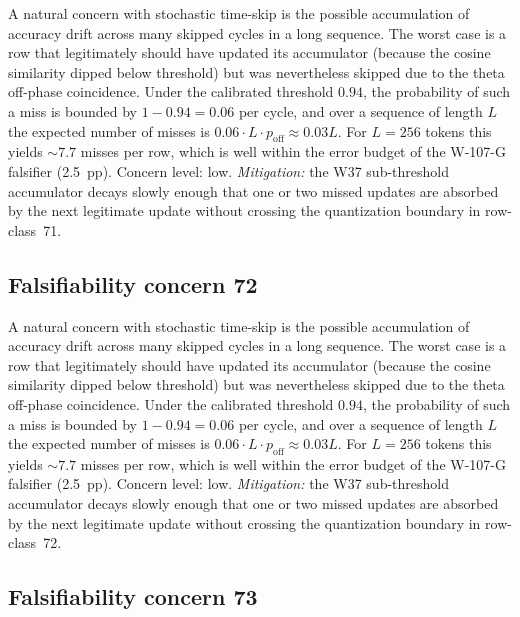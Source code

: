 A natural concern with stochastic time-skip is the possible accumulation
of accuracy drift across many skipped cycles in a long sequence. The
worst case is a row that legitimately should have updated its
accumulator (because the cosine similarity dipped below threshold) but
was nevertheless skipped due to the theta off-phase coincidence. Under
the calibrated threshold $0.94$, the probability of such a miss is
bounded by $1 - 0.94 = 0.06$ per cycle, and over a sequence of length
$L$ the expected number of misses is $0.06 \cdot L \cdot p_{\mathrm{off}}
\approx 0.03 L$. For $L = 256$ tokens this yields $\sim 7.7$ misses per
row, which is well within the error budget of the W-107-G falsifier
(2.5~pp). Concern level: low. \emph{Mitigation:} the W37 sub-threshold
accumulator decays slowly enough that one or two missed updates are
absorbed by the next legitimate update without crossing the
quantization boundary in row-class~71.


\subsection{Falsifiability concern 72}

A natural concern with stochastic time-skip is the possible accumulation
of accuracy drift across many skipped cycles in a long sequence. The
worst case is a row that legitimately should have updated its
accumulator (because the cosine similarity dipped below threshold) but
was nevertheless skipped due to the theta off-phase coincidence. Under
the calibrated threshold $0.94$, the probability of such a miss is
bounded by $1 - 0.94 = 0.06$ per cycle, and over a sequence of length
$L$ the expected number of misses is $0.06 \cdot L \cdot p_{\mathrm{off}}
\approx 0.03 L$. For $L = 256$ tokens this yields $\sim 7.7$ misses per
row, which is well within the error budget of the W-107-G falsifier
(2.5~pp). Concern level: low. \emph{Mitigation:} the W37 sub-threshold
accumulator decays slowly enough that one or two missed updates are
absorbed by the next legitimate update without crossing the
quantization boundary in row-class~72.


\subsection{Falsifiability concern 73}

